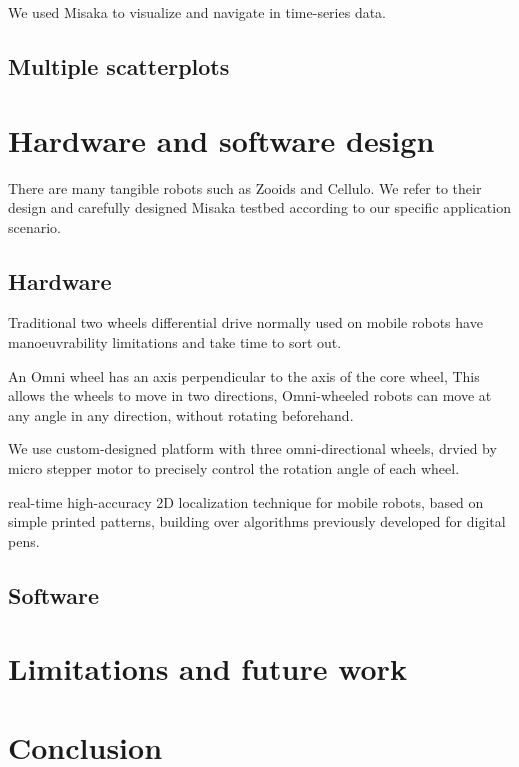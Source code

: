 \documentclass[conference]{IEEEtran}
\begin{document}
We used Misaka to visualize and navigate in time-series data.

\subsection{Multiple scatterplots}


\section{Hardware and software design}

There are many tangible robots such as Zooids\cite{le2016zooids} and Cellulo\cite{ozgur2017cellulo}. We refer to their design and carefully designed Misaka testbed according to our specific application scenario.

\subsection{Hardware}

Traditional two wheels differential drive normally used on mobile robots have manoeuvrability limitations and take time to sort out\cite{ribeiro2004three}. 

An Omni wheel has an axis perpendicular to the axis of the core wheel, This allows the wheels to move in two directions, Omni-wheeled robots can move at any angle in any direction, without rotating beforehand.

We use custom-designed platform with three omni-directional wheels, drvied by micro stepper motor to precisely control the rotation angle of each wheel.

real-time high-accuracy 2D localization technique for mobile robots, based on simple printed patterns, building over algorithms previously developed for digital pens\cite{hostettler2016real}.



\subsection{Software}

\section{Limitations and future work}

\section{Conclusion}






\end{document}
